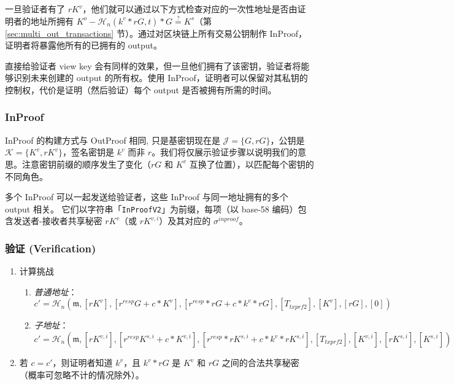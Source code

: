 一旦验证者有了 $r K^v$，他们就可以通过以下方式检查对应的一次性地址是否由证明者的地址所拥有 $K^o - \mathcal{H}_n(k^v*rG,t)*G \stackrel{?}{=} K^s$（第 \ref{sec:multi_out_transactions} 节）。通过对区块链上所有交易公钥制作 InProof，证明者将暴露他所有的已拥有的 output。

直接给验证者 view key 会有同样的效果，但一旦他们拥有了该密钥，验证者将能够识别未来创建的 output 的所有权。使用 InProof，证明者可以保留对其私钥的控制权，代价是证明（然后验证）每个 output 是否被拥有所需的时间。

\subsubsection*{InProof}

InProof 的构建方式与 OutProof 相同, 只是基密钥现在是 $\mathcal{J} = \{G, r G\}$，公钥是 $\mathcal{K} = \{K^v, r K^{v}\}$，签名密钥是 $k^v$ 而非 $r$。我们将仅展示验证步骤以说明我们的意思。注意密钥前缀的顺序发生了变化（$r G$ 和 $K^v$ 互换了位置），以匹配每个密钥的不同角色。

多个 InProof 可以一起发送给验证者，这些 InProof 与同一地址拥有的多个 output 相关。 它们以字符串「{\tt InProofV2}」为前缀，每项（以 base-58 编码）包含发送者-接收者共享秘密 $r K^v$（或 $r K^{v,i}$）及其对应的 $\sigma^{inproof}$。

\subsubsection*{验证 (Verification)}

\begin{enumerate}
    \item 计算挑战
    \begin{enumerate}
        \item {\em 普通地址}：\vspace{.145cm}
	    \[c' = \mathcal{H}_n(\mathfrak{m},[rK^v], [r^{resp} G + c*K^v], [r^{resp}*r G + c*k^v*r G], [T_{txprf2}], [K^v], [rG], [0])\]
	    \item {\em 子地址}：\vspace{.16cm}
	    \[c' = \mathcal{H}_n(\mathfrak{m},[rK^{v,i}], [r^{resp} K^{s,i} + c*K^{v,i}], [r^{resp}*r K^{s,i} + c*k^v*r K^{s,i}], [T_{txprf2}], [K^{v,i}], [r K^{s,i}], [K^{s,i}])\]
    \end{enumerate}{}
    \item 若 $c = c'$，则证明者知道 $k^v$，且 $k^v*r G$ 是 $K^v$ 和 $r G$ 之间的合法共享秘密（概率可忽略不计的情况除外）。
\end{enumerate}{}

